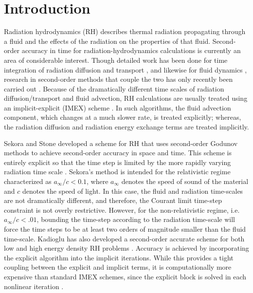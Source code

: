 \documentclass[preprint,12pt]{elsarticle}
\begin{document}
\section{Introduction}
\label{sec:Introduction}

Radiation hydrodynamics (RH) describes thermal radiation propagating through a fluid and the effects of the radiation on the properties of that fluid.  
Second-order accuracy in time for radiation-hydrodynamics calculations is currently an area of considerable interest.  Though detailed work has been 
done for time integration of radiation diffusion and transport \cite{mcclarren,lowrie2,knoll,olson,axelrod,stone,brown}, and likewise for fluid 
dynamics \cite{toro}, research in second-order methods that couple the two has only recently been carried out \cite{lowrie,bates,dai}.  Because of the 
dramatically different time scales of radiation diffusion/transport and fluid advection, RH calculations are usually treated using an implicit-explicit 
(IMEX) scheme \cite{lowrie, bates,dai}.  In such algorithms, the fluid advection component, which changes at a much slower rate, is treated explicitly; 
whereas, the radiation diffusion and radiation energy exchange terms are treated implicitly.  

Sekora and Stone developed a scheme for RH that uses second-order Godunov methods to achieve second-order accuracy in space and time.  This scheme is 
entirely explicit so that the time step is limited by the more rapidly varying radiation time scale \cite{sekora}.  Sekora's method is intended for the 
relativistic regime characterized as $a_\infty/c < 0.1$, where $a_{\infty}$ denotes the speed of sound of the material and $c$ denotes the speed of light.  In this case, 
the fluid and radiation time-scales are not dramatically different, and therefore, the Courant limit time-step constraint is not overly restrictive.  
However, for the non-relativistic regime, i.e. $a_\infty/c < .01$, bounding the time-step according to the radiation time-scale will force the time steps 
to be at least two orders of magnitude smaller than the fluid time-scale.  Kadioglu has also developed a second-order accurate scheme for both low and 
high energy density RH problems \cite{kadioglu,kadioglu2}.  Accuracy is achieved by incorporating the explicit algorithm into the implicit iterations. 
While this provides a tight coupling between the explicit and implicit terms, it is computationally more expensive than standard IMEX schemes, since the 
explicit block is solved in each nonlinear iteration \cite{kadioglu}.
\end{document}
